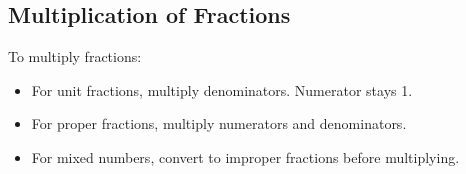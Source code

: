 \documentclass[12pt]{book}
\begin{document}













\twosidedpaper
\subsection{Multiplication of Fractions}

To multiply fractions:  
\begin{itemize}
  \item For unit fractions, multiply denominators. Numerator stays 1.  
  \item For proper fractions, multiply numerators and denominators.  
  \item For mixed numbers, convert to improper fractions before multiplying.  
\end{itemize}
\end{document}
